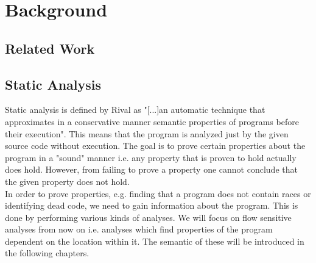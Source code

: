 
\chapter{Background}\label{chapter:Background}

  \section{Related Work}
  \section{Static Analysis}
  Static analysis is defined by Rival \cite{rival2020introduction} as "[...]an automatic technique that approximates in a conservative manner semantic properties of programs before their execution". This means that the program is analyzed just by the given source code without execution. The goal is to prove certain properties about the program in a "sound" manner i.e. any property that is proven to hold actually does hold. However, from failing to prove a property one cannot conclude that the given property does not hold.\\
  In order to prove properties, e.g. finding that a program does not contain races or identifying dead code, we need to gain information about the program. This is done by performing various kinds of analyses. We will focus on flow sensitive analyses from now on i.e. analyses which find properties of the program dependent on the location within it. The semantic of these will be introduced in the following chapters.
  
